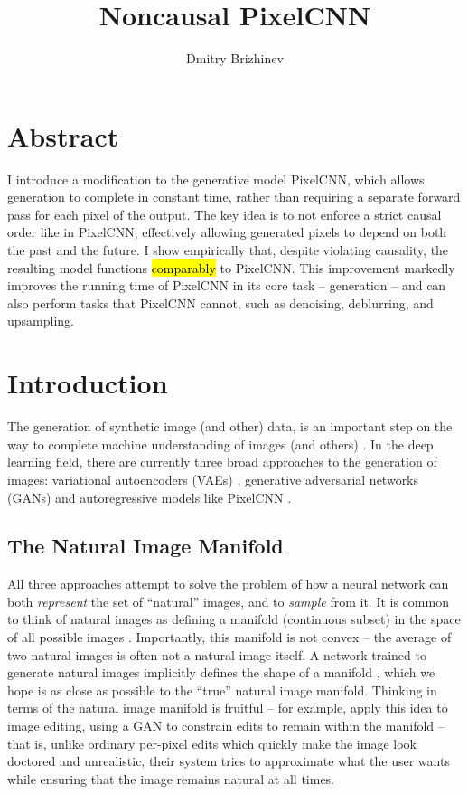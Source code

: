 \documentclass[10pt,a4paper]{article}
\newcommand{\nquote}[1]{``{#1}''}
\begin{document}
\title{\vspace{-10ex}Noncausal PixelCNN}
\author{Dmitry Brizhinev}
\maketitle

\section*{Abstract}
I introduce a modification to the generative model PixelCNN, which allows generation to complete in constant time, rather than requiring a separate forward pass for each pixel of the output. The key idea is to not enforce a strict causal order like in PixelCNN, effectively allowing generated pixels to depend on both the past and the future. I show empirically that, despite violating causality, the resulting model functions \hl{comparably} to PixelCNN. This improvement markedly improves the running time of PixelCNN in its core task -- generation -- and can also perform tasks that PixelCNN cannot, such as denoising, deblurring, and upsampling.

\tableofcontents

\section{Introduction}

The generation of synthetic image (and other) data, is an important step on the way to complete machine understanding of images (and others) \cite{??}. In the deep learning field, there are currently three broad approaches to the generation of images: variational autoencoders (VAEs) \cite{??}, generative adversarial networks (GANs) \cite{??} and autoregressive models like PixelCNN \cite{??}.

\subsection{The Natural Image Manifold}

All three approaches attempt to solve the problem of how a neural network can both \emph{represent} the set of \nquote{natural} images, and to \emph{sample} from it. It is common to think of natural images as defining a manifold (continuous subset) in the space of all possible images \cite{??}. Importantly, this manifold is not convex -- the average of two natural images is often not a natural image itself. A network trained to generate natural images implicitly defines the shape of a manifold \cite{??}, which we hope is as close as possible to the \nquote{true} natural image manifold. Thinking in terms of the natural image manifold is fruitful -- for example, \cite{??} apply this idea to image editing, using a GAN to constrain edits to remain within the manifold -- that is, unlike ordinary per-pixel edits which quickly make the image look doctored and unrealistic, their system tries to approximate what the user wants while ensuring that the image remains natural at all times.
\end{document}

